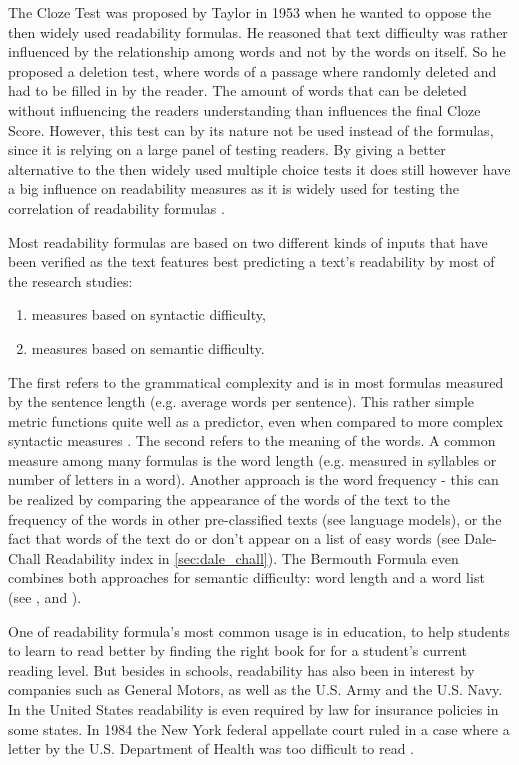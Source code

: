 \documentclass[runningheads,a4paper]{llncs}
\begin{document}
The Cloze Test was proposed by Taylor in 1953 \cite{Taylor1953} when he wanted to oppose the then widely used readability formulas. He reasoned that text difficulty was rather influenced by the relationship among words and not by the words on itself. So he proposed a deletion test, where words of a passage where randomly deleted and had to be filled in by the reader. The amount of words that can be deleted without influencing the readers understanding than influences the final Cloze Score. However, this test can by its nature not be used instead of the formulas, since it is relying on a large panel of testing readers. By giving a better alternative to the then widely used multiple choice tests it does still however have a big influence on readability measures as it is widely used for testing the correlation of readability formulas \cite{Chall1995}.

Most readability formulas are based on two different kinds of inputs that have been verified as the text features best predicting a text's readability by most of the research studies:
\begin{enumerate}
	\item measures based on syntactic difficulty,
	\item measures based on semantic difficulty.
\end{enumerate}
The first refers to the grammatical complexity and is in most formulas measured by the sentence length (e.g. average words per sentence). This rather simple metric functions quite well as a predictor, even when compared to more complex syntactic measures \cite{Chall1995}.
The second refers to the meaning of the words. A common measure among many formulas is the word length (e.g. measured in syllables or number of letters in a word). Another approach is the word frequency - this can be realized by comparing the appearance of the words of the text to the frequency of the words in other pre-classified texts (see language models), or the fact that words of the text do or don't appear on a list of easy words (see Dale-Chall Readability index in \ref{sec:dale_chall}). The Bermouth Formula even combines both approaches for semantic difficulty: word length and a word list (see \cite{Chall1995}, and \cite{Fry2006}).

One of readability formula's most common usage is in education, to help students to learn to read better by finding the right book for for a student's current reading level. But besides in schools, readability has also been in interest by companies such as General Motors, as well as the U.S. Army and the U.S. Navy. In the United States readability is even required by law for insurance policies in some states. In 1984 the New York federal appellate court ruled in a case where a letter by the U.S. Department of Health was too difficult to read \cite{Fry2006}.
\end{document}
